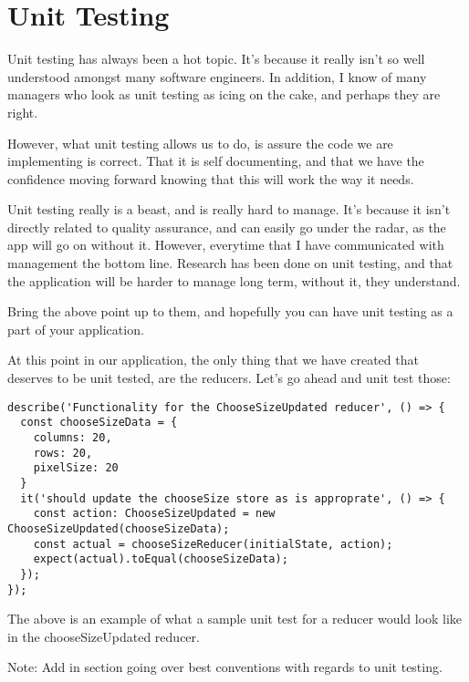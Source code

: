 \maketitle{}
\section{ Unit Testing }

Unit testing has always been a hot topic. It's because it really isn't so well
understood amongst many software engineers. In addition, I know of many managers
who look as unit testing as icing on the cake, and perhaps they are right.

However, what unit testing allows us to do, is assure the code we are implementing
is correct. That it is self documenting, and that we have the confidence moving
forward knowing that this will work the way it needs.

Unit testing really is a beast, and is really hard to manage. It's because it
isn't directly related to quality assurance, and can easily go under the radar,
as the app will go on without it. However, everytime that I have communicated
with management the bottom line. Research has been done on unit testing, and that
the application will be harder to manage long term, without it, they understand.

Bring the above point up to them, and hopefully you can have unit testing as a
part of your application.

At this point in our application, the only thing that we have created that
deserves to be unit tested, are the reducers. Let's go ahead and unit test those:

\begin{lstlisting}
describe('Functionality for the ChooseSizeUpdated reducer', () => {
  const chooseSizeData = {
    columns: 20,
    rows: 20,
    pixelSize: 20
  }
  it('should update the chooseSize store as is approprate', () => {
    const action: ChooseSizeUpdated = new ChooseSizeUpdated(chooseSizeData);
    const actual = chooseSizeReducer(initialState, action);
    expect(actual).toEqual(chooseSizeData);
  });
});
\end{lstlisting}

The above is an example of what a sample unit test for a reducer would look like
in the chooseSizeUpdated reducer.

Note: Add in section going over best conventions with regards to unit testing.

\maketitle{}
